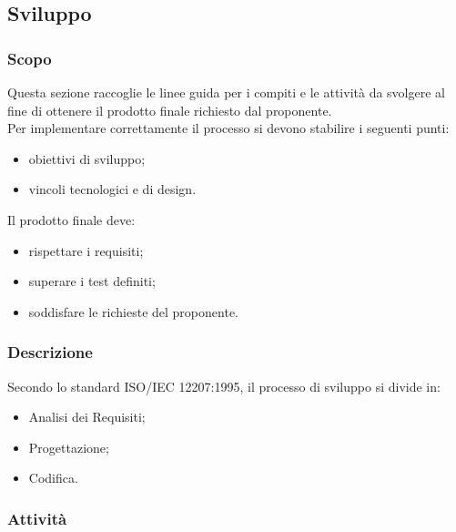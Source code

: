 \subsection{Sviluppo}

	\subsubsection{Scopo}
	Questa sezione raccoglie le linee guida per i compiti e le attività da svolgere al fine di ottenere il prodotto finale richiesto dal proponente. \\
	Per implementare correttamente il processo si devono stabilire i seguenti punti:
	\begin{itemize}
		\item obiettivi di sviluppo;
		\item vincoli tecnologici e di design.
	\end{itemize}
	Il prodotto finale deve:
	\begin{itemize}
		\item rispettare i requisiti;
		\item superare i test definiti;
		\item soddisfare le richieste del proponente.
	\end{itemize}
	\subsubsection{Descrizione}
	Secondo lo standard ISO/IEC 12207:1995, il processo di sviluppo si divide in:
	\begin{itemize}
		\item Analisi dei Requisiti;
		\item Progettazione;
		\item Codifica.
	\end{itemize}

	\subsubsection{Attività}

